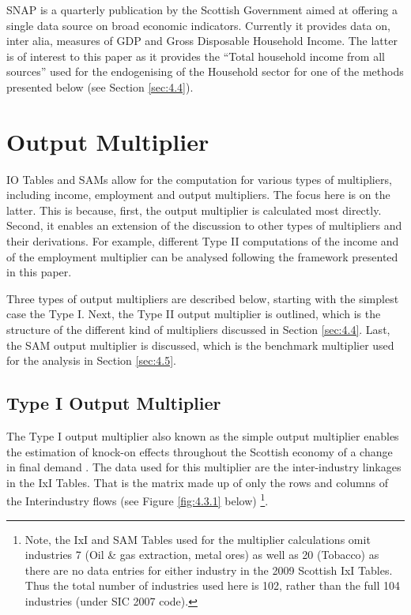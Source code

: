 \begin{doublespacing}
SNAP is a quarterly publication by the Scottish Government aimed at offering a single data source on broad economic indicators. Currently it provides data on, inter alia, measures of GDP and Gross Disposable Household Income. The latter is of interest to this paper as it provides the ``Total household income from all sources'' used for the endogenising of the Household sector for one of the methods presented below (see Section \ref{sec:4.4}).


\newpage
    \section{Output Multiplier}
\label{sec:4.3}

IO Tables and SAMs allow for the computation for various types of multipliers, including income, employment and output multipliers. The focus here is on the latter. This is because, first, the output multiplier is calculated most directly. Second, it enables an extension of the discussion to other types of multipliers and their derivations. For example, different Type II computations of the income and of the employment multiplier can be analysed following the framework presented in this paper.

\bigskip

Three types of output multipliers are described below, starting with the simplest case the Type I. Next, the Type II output multiplier is outlined, which is the structure of the different kind of multipliers discussed in Section \ref{sec:4.4}. Last, the SAM output multiplier is discussed, which is the benchmark multiplier used for the analysis in Section \ref{sec:4.5}.

\subsection{Type I Output Multiplier}
\label{sec:4.3.1}

The Type I output multiplier also known as the simple output multiplier enables the estimation of knock-on effects throughout the Scottish economy of a change in final demand \cite{Miller2009}. The data used for this multiplier are the inter-industry linkages in the IxI Tables. That is the matrix made up of only the rows and columns of the Interindustry flows (see Figure \ref{fig:4.3.1} below) \footnote{ Note, the IxI and SAM Tables used for the multiplier calculations omit industries 7 (Oil \& gas extraction, metal ores) as well as 20 (Tobacco) as there are no data entries for either industry in the 2009 Scottish IxI Tables. Thus the total number of industries used here is 102, rather than the full 104 industries (under SIC 2007 code).}.


\end{doublespacing}
